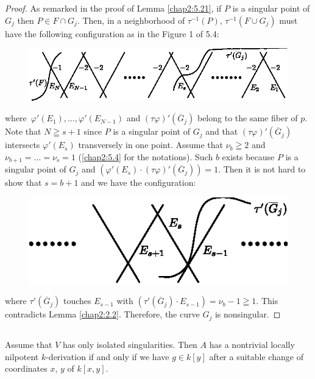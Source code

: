 \begin{proof}
As remarked in the proof of Lemma \ref{chap2:5.21}, if $P$ is a singular
point of $G_{j}$ then $P\in F\cap G_{j}$. Then, in a neighborhood of
$\tau^{-1}(P)$, $\tau^{-1}(F\cup G_{j})$ must have the following
configuration as in the Figure 1 of 5.4:
\begin{figure}[H]
\centering
\includegraphics{figures/chap2-fig13.eps}
\end{figure}
\noindent
where\pageoriginale\ $\varphi'(E_{1}),\ldots,\varphi'(E_{N-1})$ and
$(\tau\varphi)'(\overline{G}_{j})$ belong to the same fiber of
$p$. Note that $N\geqq s+1$ since $P$ is a singular point of $G_{j}$
and that $(\tau\varphi)'(\overline{G}_{j})$ intersects
$\varphi'(E_{s})$ transversely in one point. Assume that
$\nu_{b}\geqq 2$ and $\nu_{b+1}=\ldots=\nu_{s}=1$ (\cf \ref{chap2:5.4} for
the notations). Such $b$ exists because $P$ is a singular point of
$G_{j}$ and $(\varphi'(E_{s})\cdot
(\tau\varphi)'(\overline{G}_{j}))=1$. Then it is not hard to show that
$s=b+1$ and we have the configuration:
\begin{figure}[H]
\centering
\includegraphics[scale=1.1]{figures/chap2-fig14.eps}
\end{figure}
\noindent
where $\tau'(\overline{G}_{j})$ touches $E_{s-1}$ with
$(\tau'(\overline{G}_{j})\cdot E_{s-1})=\nu_{b}-1\geqq 1$. This
contradicts Lemma \ref{chap2:2.2}. Therefore, the curve $G_{j}$ is
nonsingular. 
\end{proof}

\subsection{}\label{chap2:5.23}
\begin{theorem*}
  Assume that $V$ has only isolated singularities. Then $A$ has a
  nontrivial locally nilpotent $k$-derivation if and only if we have
  $g\in k[y]$ after a suitable change of coordinates $x$, $y$ of $k[x,y]$.
\end{theorem*}

